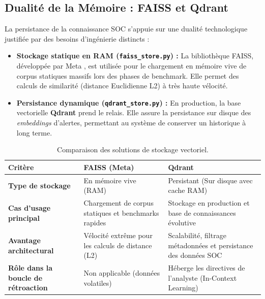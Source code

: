 \documentclass[a4paper, 12pt]{report}
\begin{document}
\subsection{Dualité de la Mémoire : FAISS et Qdrant}
La persistance de la connaissance SOC s'appuie sur une dualité technologique justifiée par des besoins d'ingénierie distincts :
\begin{itemize}
    \item \textbf{Stockage statique en RAM (\texttt{faiss\_store.py}) :} La bibliothèque FAISS, développée par Meta \cite{faiss_paper}, est utilisée pour le chargement en mémoire vive de corpus statiques massifs lors des phases de benchmark. Elle permet des calculs de similarité (distance Euclidienne L2) à très haute vélocité.
    \item \textbf{Persistance dynamique (\texttt{qdrant\_store.py}) :} En production, la base vectorielle \textbf{Qdrant} \cite{qdrant} prend le relais. Elle assure la persistance sur disque des \textit{embeddings} d'alertes, permettant au système de conserver un historique à long terme.
\end{itemize}

\begin{table}[htbp]
\centering
\caption[Comparaison des stockages vectoriels]{Comparaison des solutions de stockage vectoriel.}
\label{tab:comparaison_rag}
\vspace{0.2cm}
\begin{tabular}{|>{\raggedright\arraybackslash}p{4cm}|>{\raggedright\arraybackslash}p{5cm}|>{\raggedright\arraybackslash}p{5cm}|}
\hline
\textbf{Critère} & \textbf{FAISS (Meta)} & \textbf{Qdrant} \\ \hline
\textbf{Type de stockage} & En mémoire vive (RAM) & Persistant (Sur disque avec cache RAM) \\ \hline
\textbf{Cas d'usage principal} & Chargement de corpus statiques et benchmarks rapides & Stockage en production et base de connaissances évolutive \\ \hline
\textbf{Avantage architectural} & Vélocité extrême pour les calculs de distance (L2) & Scalabilité, filtrage métadonnées et persistance des données SOC \\ \hline
\textbf{Rôle dans la boucle de rétroaction} & Non applicable (données volatiles) & Héberge les directives de l'analyste (In-Context Learning) \\ \hline
\end{tabular}
\end{table}
\end{document}
